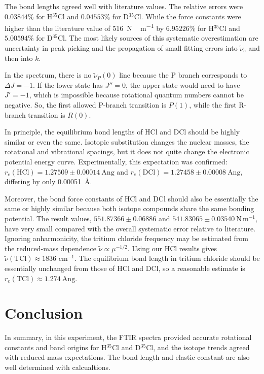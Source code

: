 \documentclass[12pt]{article}
\begin{document}
The bond lengths agreed well with literature values. The relative errors were $0.03844\%$ for H\(^{35}\)Cl and $0.04553\%$ for D\(^{35}\)Cl. While the force constants were higher than the literature value of \SI{516}{N\,m^{-1}} by $6.95226\%$ for H\(^{35}\)Cl and $5.00594\%$ for D\(^{35}\)Cl. The most likely sources of this systematic overestimation are uncertainty in peak picking and the propagation of small fitting errors into \(\tilde{\nu}_e\) and then into \(k\).

In the spectrum, there is no \(\tilde{\nu}_P(0)\) line because the P branch corresponds to \(\Delta J=-1\). If the lower state has \(J''=0\), the upper state would need to have \(J'=-1\), which is impossible because rotational quantum numbers cannot be negative. So, the first allowed P-branch transition is \(P(1)\), while the first R-branch transition is \(R(0)\).

In principle, the equilibrium bond lengths of HCl and DCl should be highly similar or even the same. Isotopic substitution changes the nuclear masses, the rotational and vibrational spacings, but it does not quite change the electronic potential energy curve. Experimentally, this expectation was confirmed: \(r_e(\mathrm{HCl})=1.27509\pm0.00014\ \text{Ang}\) and \(r_e(\mathrm{DCl})=1.27458\pm0.00008\ \text{Ang}\), differing by only \SI{0.00051}{\angstrom}.

Moreover, the bond force constants of HCl and DCl should also be essentially the same or highly similar because both isotope compounds share the same bonding potential. The result values, \(551.87366 \pm 0.06886\) and \(541.83065 \pm 0.03540\ \mathrm{N\,m^{-1}}\), have very small compared with the overall systematic error relative to literature. Ignoring anharmonicity, the tritium chloride frequency may be estimated from the reduced-mass dependence \(\tilde{\nu}\propto \mu^{-1/2}\). Using our HCl results gives \(\tilde{\nu}(\mathrm{TCl})\approx 1836\) $\mathrm{cm^{-1}}$. The equilibrium bond length in tritium chloride should be essentially unchanged from those of HCl and DCl, so a reasonable estimate is \(r_e(\mathrm{TCl})\approx 1.274\ \text{Ang}\).

\section*{Conclusion}
In summary, in this experiment, the FTIR spectra provided accurate rotational constants and band origins for H\(^{35}\)Cl and D\(^{35}\)Cl, and the isotope trends agreed with reduced-mass expectations. The bond length and elastic constant are also well determined with calcualtions.
\end{document}
